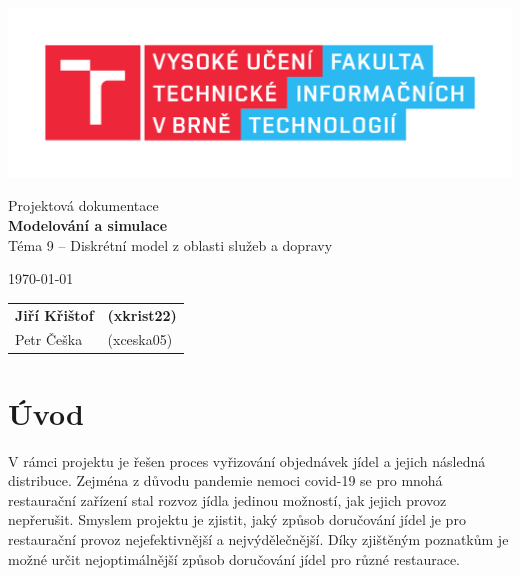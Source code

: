 \documentclass[a4paper, 11pt]{article}
\begin{document}
	\begin{titlepage}
		\begin{center}
			\includegraphics[width=0.77\linewidth]{FIT_logo.pdf} \\


			\Huge{Projektová dokumentace} \\
			\LARGE{\textbf{Modelování a simulace}} \\
			\Large{Téma 9 -- Diskrétní model z oblasti služeb a dopravy}
		\end{center}

		\begin{minipage}{0.65 \textwidth}
			{\Large \today}
		\end{minipage}
		\hfill
		\begin{minipage}[r]{0.35 \textwidth}
			\Large
			\begin{tabular}{l l}
				\textbf{Jiří Křištof} & \textbf{(xkrist22)} \\
				Petr Češka & (xceska05) \\
			\end{tabular}
		\end{minipage}
	\end{titlepage}


\section{Úvod}
V rámci projektu je řešen proces vyřizování objednávek jídel a jejich následná distribuce. Zejména z důvodu pandemie nemoci covid-19 se pro mnohá restaurační zařízení stal rozvoz jídla jedinou možností, jak jejich provoz nepřerušit. Smyslem projektu je zjistit, jaký způsob doručování jídel je pro restaurační provoz nejefektivnější a nejvýdělečnější. Díky zjištěným poznatkům je možné určit nejoptimálnější způsob doručování jídel pro různé restaurace.
\end{document}
